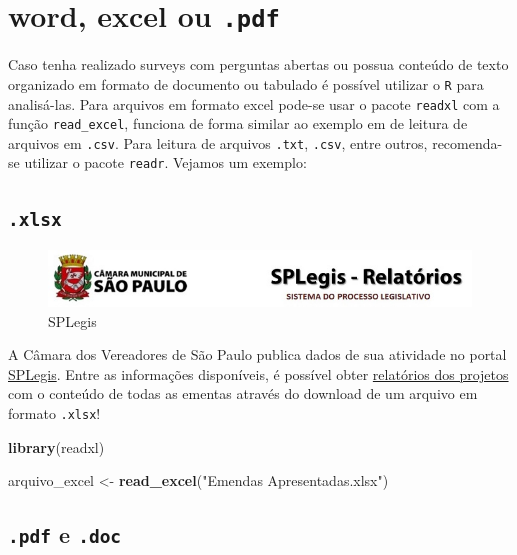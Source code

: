 \documentclass[]{book}
\newenvironment{Shaded}{\begin{snugshade}}{\end{snugshade}}
\newcommand{\KeywordTok}[1]{\textcolor[rgb]{0.13,0.29,0.53}{\textbf{#1}}}
\newcommand{\NormalTok}[1]{#1}
\newcommand{\StringTok}[1]{\textcolor[rgb]{0.31,0.60,0.02}{#1}}
\begin{document}
\hypertarget{word-excel-ou-.pdf}{%
\section{\texorpdfstring{word, excel ou \texttt{.pdf}}{word, excel ou .pdf}}\label{word-excel-ou-.pdf}}

Caso tenha realizado surveys com perguntas abertas ou possua conteúdo de texto
organizado em formato de documento ou tabulado é possível utilizar o \texttt{R} para
analisá-las. Para arquivos em formato excel pode-se usar o pacote \texttt{readxl} com a
função \texttt{read\_excel}, funciona de forma similar ao exemplo em de leitura de arquivos
em \texttt{.csv}. Para leitura de arquivos \texttt{.txt}, \texttt{.csv}, entre outros, recomenda-se
utilizar o pacote \texttt{readr}. Vejamos um exemplo:

\hypertarget{xlsx}{%
\subsection{\texorpdfstring{\texttt{.xlsx}}{.xlsx}}\label{xlsx}}

\begin{figure}
\centering
\includegraphics[width=7.29167in,height=\textheight]{images/SPLegisRelatorios.jpg}
\caption{SPLegis}
\end{figure}

A Câmara dos Vereadores de São Paulo publica dados de sua atividade no portal
\href{http://app-splegisreport-prd.azurewebsites.net/default.aspx}{SPLegis}. Entre as
informações disponíveis, é possível obter \href{http://app-splegisreport-prd.azurewebsites.net/Report/VIEW_REL_EMENDA/List.aspx}{relatórios dos projetos}
com o conteúdo de todas as ementas através do download de um arquivo em formato \texttt{.xlsx}!

\begin{Shaded}
\begin{Highlighting}[]
\KeywordTok{library}\NormalTok{(readxl)}

\NormalTok{arquivo_excel <-}\StringTok{ }\KeywordTok{read_excel}\NormalTok{(}\StringTok{"Emendas Apresentadas.xlsx"}\NormalTok{)}
\end{Highlighting}
\end{Shaded}

\hypertarget{pdf-e-.doc}{%
\subsection{\texorpdfstring{\texttt{.pdf} e \texttt{.doc}}{.pdf e .doc}}\label{pdf-e-.doc}}
\end{document}
